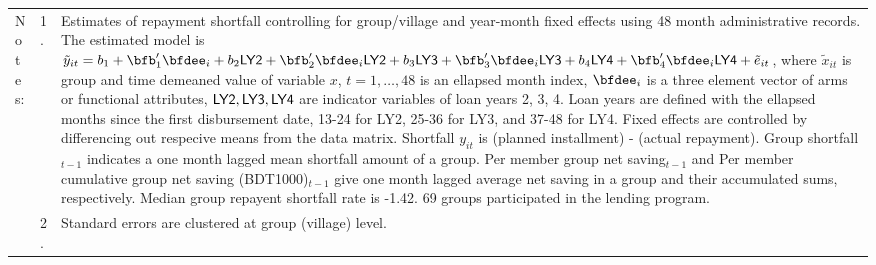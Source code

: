 \begin{minipage}[t]{14cm}
\begin{tabular}{>{\hfill\scriptsize}p{1cm}<{}>{\hfill\scriptsize}p{.25cm}<{}>{\scriptsize}p{12cm}<{\hfill}}
Notes: & 1. & Estimates of repayment shortfall controlling for group/village and year-month fixed effects using 48 month administrative records. The estimated model is $\tilde{y}_{it}=b_{1}+\bfb'_{1}\bfdee_{i}+b_{2}\mbox{\textsf{LY2}}+\bfb'_{2}\bfdee_{i}\mbox{\textsf{LY2}}+b_{3}\mbox{\textsf{LY3}}+\bfb'_{3}\bfdee_{i}\mbox{\textsf{LY3}}+b_{4}\mbox{\textsf{LY4}}+\bfb'_{4}\bfdee_{i}\mbox{\textsf{LY4}}+\tilde{e}_{it}$, where $\tilde{x}_{it}$ is group and time demeaned value of variable $x$, $t=1,\dots, 48$ is an ellapsed month index, $\bfdee_{i}$ is a three element vector of arms or functional attributes, $\mbox{\textsf{LY2}}, \mbox{\textsf{LY3}}, \mbox{\textsf{LY4}}$ are indicator variables of loan years 2, 3, 4. Loan years are defined with the ellapsed months since the first disbursement date, 13-24 for \textsf{LY2}, 25-36 for \textsf{LY3}, and 37-48 for \textsf{LY4}. Fixed effects are controlled by differencing out respecive means from the data matrix. Shortfall $y_{it}$ is (planned installment) - (actual repayment). \textsf{Group shortfall}$_{t-1}$ indicates a one month lagged mean shortfall amount of a group. \textsf{Per member group net saving}$_{t-1}$ and \textsf{Per member cumulative group net saving (BDT1000)}$_{t-1}$ give one month lagged average net saving in a group and their accumulated sums, respectively. Median group repayent shortfall rate is -1.42. 69 groups participated in the lending program. \\
& 2. & Standard errors are clustered at group (village) level.
\end{tabular}
\end{minipage}

